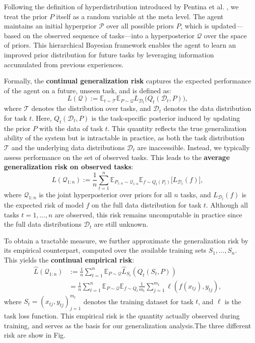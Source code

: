 \documentclass[letterpaper]{article} %
\begin{document}
Following the definition of hyperdistribution introduced by Pentina et al. , we treat the prior $P$ itself as a random variable at the meta level. The agent maintains an initial hyperprior $\mathcal{P}$ over all possible priors $P$, which is updated—based on the observed sequence of tasks—into a hyperposterior $\mathcal{Q}$ over the space of priors. This hierarchical Bayesian framework enables the agent to learn an improved prior distribution for future tasks by leveraging information accumulated from previous experiences.



Formally, the \textbf{continual generalization risk} captures the expected performance of the agent on a future, unseen task, and is defined as:
\begin{equation}
L(\mathcal{Q}) := \mathbb{E}_{t \sim \mathcal{T}}\mathbb{E}_{P \sim \mathcal{Q}}L_{\mathcal{D}_t}\big(Q_t(\mathcal{D}_t, P)\big),
\end{equation}
where $\mathcal{T}$ denotes the distribution over tasks, and $\mathcal{D}_t$ denotes the data distribution for task $t$. Here, $Q_t(\mathcal{D}_t, P)$ is the task-specific posterior induced by updating the prior $P$ with the data of task $t$. This quantity reflects the true generalization ability of the system but is intractable in practice, as both the task distribution $\mathcal{T}$ and the underlying data distributions $\mathcal{D}_t$ are inaccessible. 
Instead, we typically assess performance on the set of observed tasks. This leads to the \textbf{average generalization risk on observed tasks}:
\begin{equation}
L(\mathcal{Q}_{1:n}) :=
\frac{1}{n} \sum_{t=1}^n
\mathbb{E}_{P_{1:n} \sim \mathcal{Q}_{1:n}}
\mathbb{E}_{f \sim Q_t(P_t)}
\big[
L_{\mathcal{D}_t}(f)
\big],
\end{equation}
where $\mathcal{Q}_{1:n}$ is the joint hyperposterior over priors for all $n$ tasks, and $L_{\mathcal{D}_t}(f)$ is the expected risk of model $f$ on the full data distribution for task $t$. Although all tasks $t=1,\dots,n$ are observed, this risk remains uncomputable in practice since the full data distributions $\mathcal{D}_t$ are still unknown.


To obtain a tractable measure, we further approximate the generalization risk by its empirical counterpart, computed over the available training sets $S_1,\dots,S_n$. This yields the \textbf{continual empirical risk}:
\begin{equation}
\begin{aligned}
\hat{L}(\mathcal{Q}_{1:n}) 
&:= \frac{1}{n} \sum_{t=1}^n \mathbb{E}_{P \sim \mathcal{Q}} \hat{L}_{S_t}(Q_t(S_t, P)) \\
&= \frac{1}{n} \sum_{t=1}^n \mathbb{E}_{P \sim \mathcal{Q}} \mathbb{E}_{f\sim Q_t} \frac{1}{m_t} \sum_{j=1}^{m_t} \ell(f(x_{tj}), y_{tj}),
\end{aligned}
\end{equation}
where $S_t = {(x_{tj}, y_{tj})}_{j=1}^{m_t}$ denotes the training dataset for task $t$, and $\ell$ is the task loss function. This empirical risk is the quantity actually observed during training, and serves as the basis for our generalization analysis.The three different risk are show in Fig.
\end{document}
